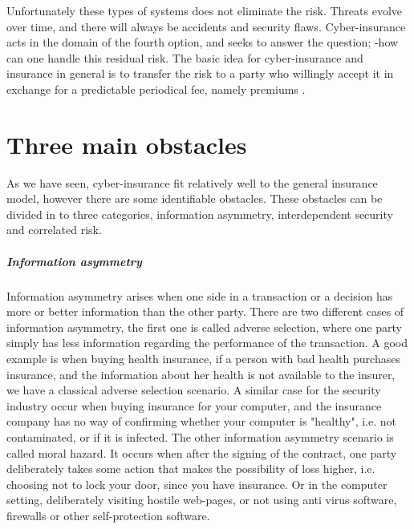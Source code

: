 Unfortunately these types of systems does not eliminate the risk. Threats evolve over time, and there will always be accidents and security flaws. Cyber-insurance acts in the domain of the fourth option, and seeks to answer the question; -how can one handle this residual risk. The basic idea for cyber-insurance and insurance in general is to transfer the risk to a party who willingly accept it in exchange for a predictable periodical fee, namely premiums \cite{bolot2008cyber}. 
   
\section{Three main obstacles}
\label{threemainobstacles}
As we have seen, cyber-insurance fit relatively well to the general insurance model, however there are some identifiable obstacles. These obstacles can be divided in to three categories, information asymmetry, interdependent security and  correlated risk. 
\subparagraph{Information asymmetry}
Information asymmetry arises when one side in a transaction or a decision has more or better
 information than the other party. There are two different cases of information asymmetry, the first
  one is called adverse selection, where one party simply has less information regarding the performance of
   the transaction. A good example is when buying health insurance, if a person with bad health purchases
    insurance, and the information about her health is not available to the insurer, we have a
     classical adverse selection scenario. A similar case for the security industry occur when buying
      insurance for your computer, and the insurance company has no way of confirming whether your
       computer is "healthy", i.e. not contaminated, or if it is infected. 
The other information asymmetry scenario is called moral hazard. It occurs when after the signing of
 the contract, one party deliberately takes some action that makes the possibility of loss higher,
  i.e. choosing not to lock your door, since you have insurance. Or in the computer setting,
   deliberately visiting hostile web-pages, or not using anti virus software, firewalls or other self-protection software.
    \cite{solutiontoinfoasym}
    
